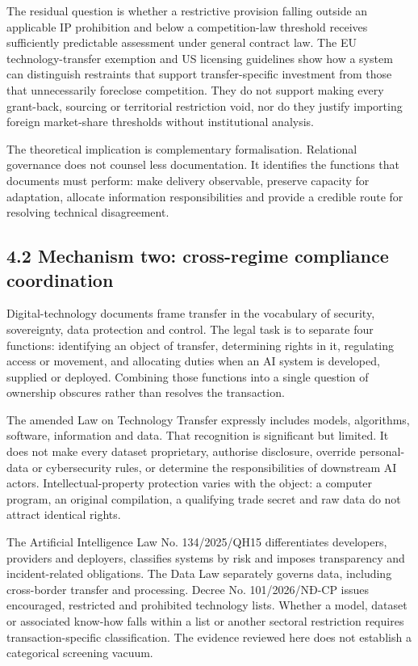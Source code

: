 \documentclass[
]{article}
\begin{document}
The residual question is whether a restrictive provision falling outside
an applicable IP prohibition and below a competition-law threshold
receives sufficiently predictable assessment under general contract law.
The EU technology-transfer exemption and US licensing guidelines show
how a system can distinguish restraints that support transfer-specific
investment from those that unnecessarily foreclose competition. They do
not support making every grant-back, sourcing or territorial restriction
void, nor do they justify importing foreign market-share thresholds
without institutional analysis.

The theoretical implication is complementary formalisation. Relational
governance does not counsel less documentation. It identifies the
functions that documents must perform: make delivery observable,
preserve capacity for adaptation, allocate information responsibilities
and provide a credible route for resolving technical disagreement.

\subsection{4.2 Mechanism two: cross-regime compliance
coordination}\label{mechanism-two-cross-regime-compliance-coordination}

Digital-technology documents frame transfer in the vocabulary of
security, sovereignty, data protection and control. The legal task is to
separate four functions: identifying an object of transfer, determining
rights in it, regulating access or movement, and allocating duties when
an AI system is developed, supplied or deployed. Combining those
functions into a single question of ownership obscures rather than
resolves the transaction.

The amended Law on Technology Transfer expressly includes models,
algorithms, software, information and data. That recognition is
significant but limited. It does not make every dataset proprietary,
authorise disclosure, override personal-data or cybersecurity rules, or
determine the responsibilities of downstream AI actors.
Intellectual-property protection varies with the object: a computer
program, an original compilation, a qualifying trade secret and raw data
do not attract identical rights.

The Artificial Intelligence Law No. 134/2025/QH15 differentiates
developers, providers and deployers, classifies systems by risk and
imposes transparency and incident-related obligations. The Data Law
separately governs data, including cross-border transfer and processing.
Decree No. 101/2026/NĐ-CP issues encouraged, restricted and prohibited
technology lists. Whether a model, dataset or associated know-how falls
within a list or another sectoral restriction requires
transaction-specific classification. The evidence reviewed here does not
establish a categorical screening vacuum.
\end{document}
